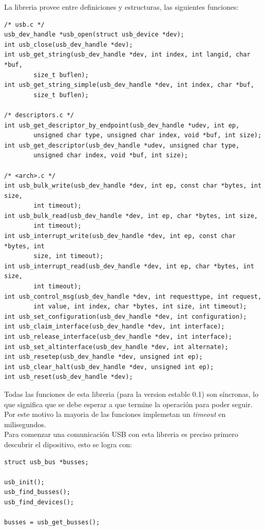 La libreria provee entre definiciones y estructuras, las siguientes funciones:
\begin{footnotesize}
\begin{verbatim}
/* usb.c */
usb_dev_handle *usb_open(struct usb_device *dev);
int usb_close(usb_dev_handle *dev);
int usb_get_string(usb_dev_handle *dev, int index, int langid, char *buf,
        size_t buflen);
int usb_get_string_simple(usb_dev_handle *dev, int index, char *buf,
        size_t buflen);

/* descriptors.c */
int usb_get_descriptor_by_endpoint(usb_dev_handle *udev, int ep,
        unsigned char type, unsigned char index, void *buf, int size);
int usb_get_descriptor(usb_dev_handle *udev, unsigned char type,
        unsigned char index, void *buf, int size);

/* <arch>.c */
int usb_bulk_write(usb_dev_handle *dev, int ep, const char *bytes, int size,
        int timeout);
int usb_bulk_read(usb_dev_handle *dev, int ep, char *bytes, int size,
        int timeout);
int usb_interrupt_write(usb_dev_handle *dev, int ep, const char *bytes, int
		size, int timeout);
int usb_interrupt_read(usb_dev_handle *dev, int ep, char *bytes, int size,
        int timeout);
int usb_control_msg(usb_dev_handle *dev, int requesttype, int request,
        int value, int index, char *bytes, int size, int timeout);
int usb_set_configuration(usb_dev_handle *dev, int configuration);
int usb_claim_interface(usb_dev_handle *dev, int interface);
int usb_release_interface(usb_dev_handle *dev, int interface);
int usb_set_altinterface(usb_dev_handle *dev, int alternate);
int usb_resetep(usb_dev_handle *dev, unsigned int ep);
int usb_clear_halt(usb_dev_handle *dev, unsigned int ep);
int usb_reset(usb_dev_handle *dev);
\end{verbatim}
\end{footnotesize}

Todas las funciones de esta libreria (para la version estable 0.1) son
s\'incronas, lo que significa que se debe esperar a que termine la operaci\'on
para poder seguir. Por este motivo la mayoria de las funciones implemetan un
\emph{timeout} en milisegundos.\\



Para comenzar una comunicaci\'on USB con esta libreria es preciso primero
descubrir el dipositivo, esto se logra con:

\begin{footnotesize}
	\begin{verbatim}
struct usb_bus *busses;
    
usb_init();
usb_find_busses();
usb_find_devices();
    
busses = usb_get_busses();
	\end{verbatim}
\end{footnotesize}

